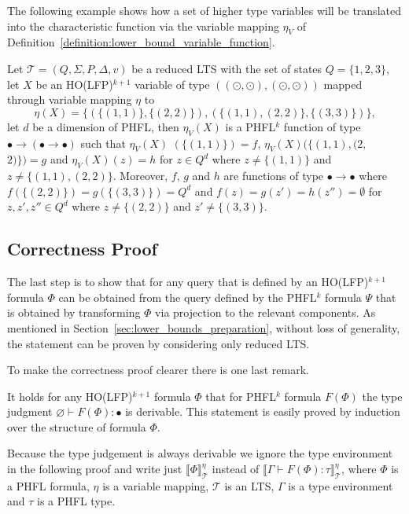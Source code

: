 The following example shows how a set of higher type variables will be translated into the characteristic function via the
variable mapping $\eta_V$ of Definition~\ref{definition:lower_bound_variable_function}.

\begin{example}
    Let $\mathcal{T} = (Q, \Sigma, P, \Delta, v)$ be a reduced LTS with the set of states $Q = \{1, 2, 3\}$, let $X$ be an HO(LFP)$^{k + 1}$
    variable of type $((\odot, \odot), (\odot, \odot))$ mapped through variable mapping $\eta$ to
    \[\eta(X) = \{(\{(1, 1)\}, \{(2, 2)\}), (\{(1, 1), (2, 2)\}, \{(3, 3)\})\},\]
    let $d$ be a dimension of PHFL, then $\eta_V(X)$ is a PHFL$^k$ function of type $\bullet \rightarrow (\bullet \rightarrow \bullet)$ such
    that $\eta_V(X)$ $(\{(1, 1)\}) = f$, $\eta_V(X)(\{(1, 1), (2, $ $2)\}) = g$ and $\eta_V(X)(z) = h$ for $z \in
    Q^d$ where $z \neq \{(1, 1)\}$ and $z \neq \{(1, 1), (2, 2)\}$. Moreover, $f$, $g$ and $h$ are functions of type $\bullet
    \rightarrow \bullet$ where $f(\{(2, 2)\}) = g(\{(3, 3)\}) = Q^d$ and $f(z) = g(z') = h(z'') = \emptyset$ for $z,
    z', z'' \in Q^d$ where $z \neq \{(2, 2)\}$ and $z' \neq \{(3, 3)\}$.
\end{example}

\subsection{Correctness Proof}\label{subsec:lower_bounds_correctness_lfp}

The last step is to show that for any query that is defined by an HO(LFP)$^{k+1}$ formula $\Phi$ can be obtained from the query defined by the PHFL$^k$ formula $\Psi$ that is obtained by transforming $\Phi$ via projection to the relevant components. As mentioned in Section~\ref{sec:lower_bounds_preparation}, without loss of generality, the statement can be proven by considering only reduced LTS. 

To make the correctness proof clearer there is one last remark.

\begin{remark}
    It holds for any HO(LFP)$^{k+1}$ formula $\Phi$ that for PHFL$^k$ formula $F(\Phi)$ the type judgment $\varnothing \vdash
    F(\Phi) \colon \bullet$ is derivable. This statement
    is easily proved by induction over the structure of formula $\Phi$. 
\end{remark}

Because the type judgement is always derivable we ignore the type environment in the following proof and write just $\llbracket \Phi \rrbracket^\eta_\mathcal{T}$ instead of $\llbracket \Gamma \vdash F(\Phi) \colon \tau \rrbracket^\eta_\mathcal{T}$, where $\Phi$ is a PHFL formula, $\eta$ is a variable mapping, $\mathcal{T}$ is an LTS, $\Gamma$ is a type environment and $\tau$ is a PHFL type.

